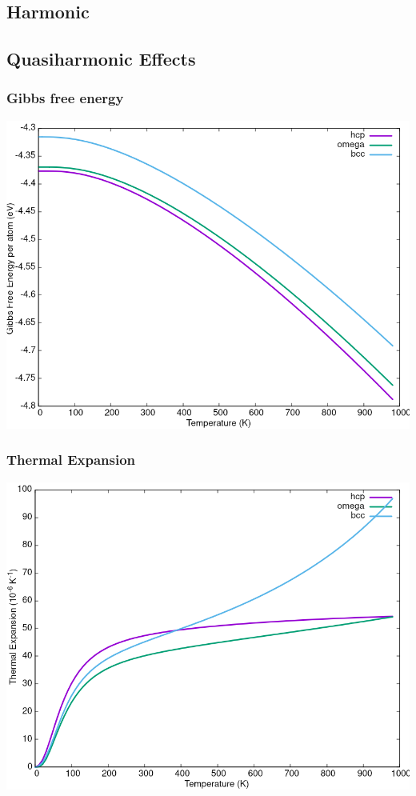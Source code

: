 \documentclass[11pt]{article}
\begin{document}
\subsection{Harmonic}
\label{sec:orgb5d52a2}

\subsection{Quasiharmonic Effects}
\label{sec:org9863b54}

\subsubsection{Gibbs free energy}
\label{sec:orgcfaf06e}

\begin{center}
\includegraphics[width=.9\linewidth]{Images/gibbs_free_energy_per_atom_2020-04-02.png}
\end{center}

\subsubsection{Thermal Expansion}
\label{sec:orgbd36186}

\begin{center}
\includegraphics[width=.9\linewidth]{Images/thermal_expansion_all_phases_2020-04-02.png}
\end{center}
\end{document}
